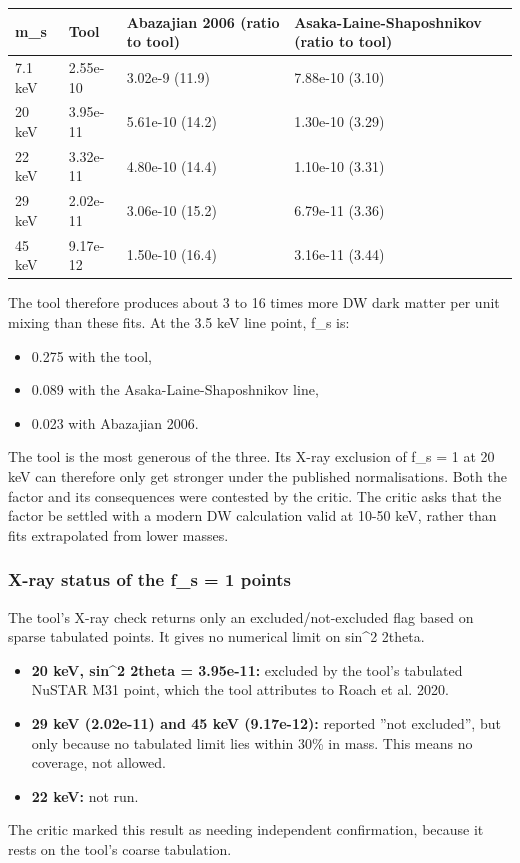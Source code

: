 \documentclass[11pt,a4paper]{article}
\begin{document}
\begin{longtable}{@{}p{}p{}p{}p{}@{}}
\toprule
\textbf{m\_s} & \textbf{Tool} & \textbf{Abazajian 2006 (ratio to tool)} & \textbf{Asaka-Laine-Shaposhnikov (ratio to tool)} \\ \midrule \endhead
7.1 keV & 2.55e-10 & 3.02e-9 (11.9) & 7.88e-10 (3.10) \\
20 keV & 3.95e-11 & 5.61e-10 (14.2) & 1.30e-10 (3.29) \\
22 keV & 3.32e-11 & 4.80e-10 (14.4) & 1.10e-10 (3.31) \\
29 keV & 2.02e-11 & 3.06e-10 (15.2) & 6.79e-11 (3.36) \\
45 keV & 9.17e-12 & 1.50e-10 (16.4) & 3.16e-11 (3.44) \\
\bottomrule\end{longtable}
The tool therefore produces about 3 to 16 times more DW dark matter per unit mixing than these fits. At the 3.5 keV line point, f\_s is:

\begin{itemize}
  \item 0.275 with the tool,
  \item 0.089 with the Asaka-Laine-Shaposhnikov line,
  \item 0.023 with Abazajian 2006.
\end{itemize}
The tool is the most generous of the three. Its X-ray exclusion of f\_s = 1 at 20 keV can therefore only get stronger under the published normalisations. Both the factor and its consequences were contested by the critic. The critic asks that the factor be settled with a modern DW calculation valid at 10-50 keV, rather than fits extrapolated from lower masses.

\subsubsection{X-ray status of the f\_s = 1 points}
The tool's X-ray check returns only an excluded/not-excluded flag based on sparse tabulated points. It gives no numerical limit on sin\textasciicircum{}2 2theta.

\begin{itemize}
  \item \textbf{20 keV, sin\textasciicircum{}2 2theta = 3.95e-11:} excluded by the tool's tabulated NuSTAR M31 point, which the tool attributes to Roach et al. 2020.
  \item \textbf{29 keV (2.02e-11) and 45 keV (9.17e-12):} reported ''not excluded'', but only because no tabulated limit lies within 30\% in mass. This means no coverage, not allowed.
  \item \textbf{22 keV:} not run.
\end{itemize}
The critic marked this result as needing independent confirmation, because it rests on the tool's coarse tabulation.
\end{document}
